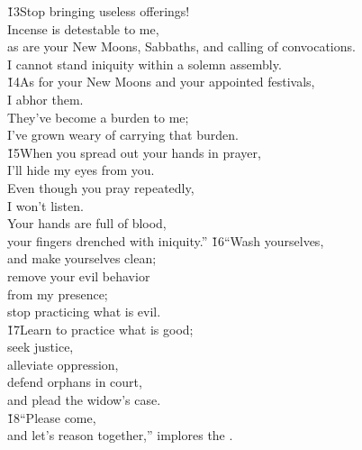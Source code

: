 \begin{poetry}
\poeml \v{13}Stop bringing useless offerings! \\
\poemll    Incense is detestable to me, \\
\poeml as are your New Moons, Sabbaths, and calling of convocations. \\
\poemll    I cannot stand iniquity within a solemn assembly. \\
\poeml \v{14}As for your New Moons and your appointed festivals, \\
\poemll    I abhor them. \\
\poeml They've become a burden to me; \\
\poemll    I've grown weary of carrying that burden. \\
\poeml \v{15}When you spread out your hands in prayer, \\
\poemll    I'll hide my eyes from you. \\
\poeml Even though you pray repeatedly, \\
\poemll    I won't listen. \\
\poeml Your hands are full of blood, \\
\poemll    your fingers drenched with iniquity.''
\poeml \v{16}``Wash yourselves, \\
\poemll    and make yourselves clean; \\
\poeml remove your evil behavior \\
\poemll    from my presence; \\
\poemlll       stop practicing what is evil. \\
\poeml \v{17}Learn to practice what is good; \\
\poemll    seek justice, \\
\poeml alleviate oppression, \\
\poemll    defend orphans in court, \\
\poemlll       and plead the widow's case. \\
\poeml \v{18}``Please come, \\
\poemll    and let's reason together,'' implores the . \\

\end{poetry}
